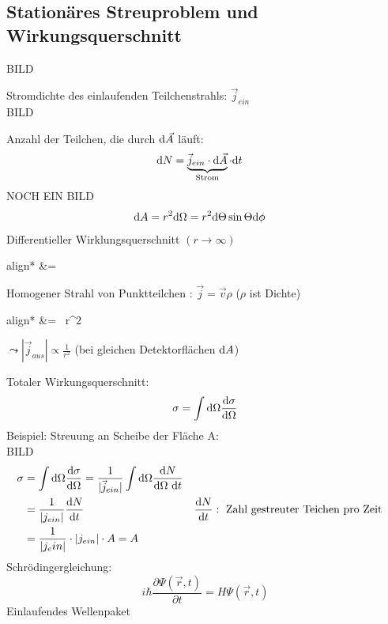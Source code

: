 \subsection{Stationäres Streuproblem und Wirkungsquerschnitt}
	BILD
		
	Stromdichte des einlaufenden Teilchenstrahls: $\vec{j}_{ein}$
	\\
	BILD
	
	Anzahl der Teilchen, die durch $\mathrm{d} \vec{A}$ läuft:
		\begin{align*}
			\diff N &= 
			\underbrace{\vec{j}_{ein} \cdot \diff \vec{A}}_{\mathclap{\text{Strom}}}
			\cdot \diff t
		\end{align*}
	NOCH EIN BILD
		\begin{align*}
			\mathrm{d} A &= r^2 \mathrm{d} \Omega = r^2 \mathrm{d} \Theta \sin \Theta \mathrm{d} \phi
		\end{align*}
	Differentieller Wirklungsquerschnitt $(r \rightarrow \infty)$
		\begin{empheq}[box=\boxed]{align*}
			\frac{\diff \sigma}{\diff \Omega} &=
			 
		\end{empheq}
	Homogener Strahl von Punktteilchen : $\vec{j} = \vec{v} \rho$ ($\rho$ ist Dichte)
		\begin{empheq}[box=\boxed]{align*}
			\frac{\diff \sigma}{\diff \Omega} &=
			 ~r^2
		\end{empheq}
	$ \leadsto |\vec{j}_{aus}| \propto \frac{1}{r^2}$ (bei gleichen Detektorflächen $\mathrm{d} A$)
	
	Totaler Wirkungsquerschnitt:
		\begin{align*}
			\sigma = \int \mathrm{d} \Omega \frac{\mathrm{d} \sigma}{\mathrm{d} \Omega}
		\end{align*}
	Beispiel: Streuung an Scheibe der Fläche A:
	\\
	BILD
	\\
		\begin{align*}
			\sigma &= \int \mathrm{d} \Omega \frac{\mathrm{d} \sigma}{\mathrm{d} \Omega}
			= \frac{1}{|\vec{j}_{ein}|} \int \mathrm{d} \Omega \frac{\mathrm{d} N}{\mathrm{d} \Omega ~\mathrm{d} t}\\
			&= \frac{1}{|j_{ein}|} \frac{\mathrm{d} N}{\mathrm{d} t} & &\frac{\mathrm{d} N}{\mathrm{d} t}: 
			\text{~Zahl gestreuter Teichen pro Zeit} \\
			&= \frac{1}{|j_ein|} \cdot |j_{ein}| \cdot A = A
		\end{align*}
	Schrödingergleichung: 
		\begin{equation*}
			i \hbar \frac{\partial \Psi (\vec{r}, t)}{\partial t} = H \Psi (\vec{r} , t) 
		\end{equation*}
	Einlaufendes Wellenpaket
	
